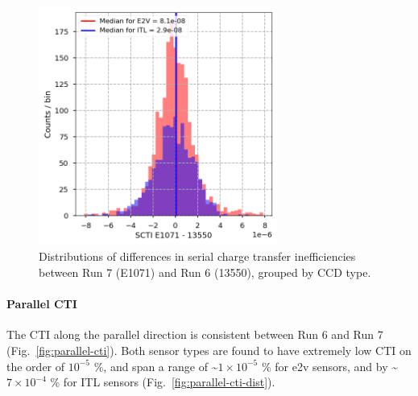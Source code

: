 \begin{figure}[ht]
\begin{centering}
\includegraphics[width=0.7\textwidth]{figures/baselineCharacterization/SCTI_13550_E1071_diff.png}
\caption{Distributions of differences in serial charge transfer inefficiencies between Run 7 (E1071) and Run 6 (13550), grouped by CCD type.}
\label{fig:serial-cti-dist}
\end{centering}
\end{figure}

\paragraph{Parallel CTI}\label{parallel-cti}

The CTI along the parallel direction is consistent between Run 6 and
Run 7 (Fig.~\ref{fig:parallel-cti}). Both sensor types are found to have extremely low CTI on the order of $10^{-5}$ \%,
and span a range of \textasciitilde$1 \times 10^{-5}$ \% for e2v sensors, and
by \textasciitilde$7 \times 10^{-4}$ \% for ITL sensors (Fig.~\ref{fig:parallel-cti-dist}).

